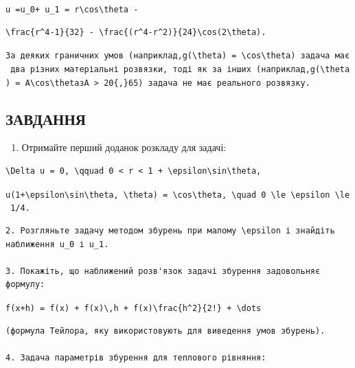 \documentclass[
  ukrainian,
]{article}
\providecommand{\tightlist}{%
  \setlength{\itemsep}{0pt}\setlength{\parskip}{0pt}}
\begin{document}
\texttt{u\ =\textquotesingle{}u\_0\textquotesingle{}+\ u\_1\ =\ r\textbackslash{}cos\textbackslash{}theta\ -}

\begin{verbatim}
\frac{r^4-1}{32} - \frac{(r^4-r^2)}{24}\cos(2\theta).
\end{verbatim}

\texttt{За\ деяких\ граничних\ умов\ (наприклад,\textquotesingle{}g(\textbackslash{}theta)\ =\ \textbackslash{}cos\textbackslash{}theta\textquotesingle{})\ задача\ має\ два\ різних\ матеріальні\ розв\textquotesingle{}язки,\ тоді\ як\ за\ інших\ (наприклад,\textquotesingle{}g(\textbackslash{}theta)\ =\ A\textbackslash{}cos\textbackslash{}theta\textquotesingle{}з\textquotesingle{}A\ \textgreater{}\ 20\{,\}65\textquotesingle{})\ задача\ не\ має\ реального\ розв\textquotesingle{}язку.}

\subsection{ЗАВДАННЯ}\label{ux437ux430ux432ux434ux430ux43dux43dux44f-10}

\begin{enumerate}
\def\labelenumi{\arabic{enumi}.}
\tightlist
\item
  Отримайте перший доданок розкладу для задачі:
\end{enumerate}

\begin{verbatim}
\Delta u = 0, \qquad 0 < r < 1 + \epsilon\sin\theta,
\end{verbatim}

\texttt{u(1+\textbackslash{}epsilon\textbackslash{}sin\textbackslash{}theta,\ \textbackslash{}theta)\ =\ \textbackslash{}cos\textbackslash{}theta,\ \textbackslash{}quad\ 0\ \textbackslash{}le\ \textbackslash{}epsilon\ \textbackslash{}le\ 1/4.}

\begin{verbatim}
2. Розгляньте задачу методом збурень при малому \epsilon і знайдіть наближення u_0 і u_1.

3. Покажіть, що наближений розв'язок задачі збурення задовольняє формулу:
\end{verbatim}

\texttt{f(x+h)\ =\ f(x)\ +\ f\textquotesingle{}(x)\textbackslash{},h\ +\ f\textquotesingle{}\textquotesingle{}(x)\textbackslash{}frac\{h\^{}2\}\{2!\}\ +\ \textbackslash{}dots}

\begin{verbatim}
(формула Тейлора, яку використовують для виведення умов збурень).

4. Задача параметрів збурення для теплового рівняння:
\end{verbatim}
\end{document}
